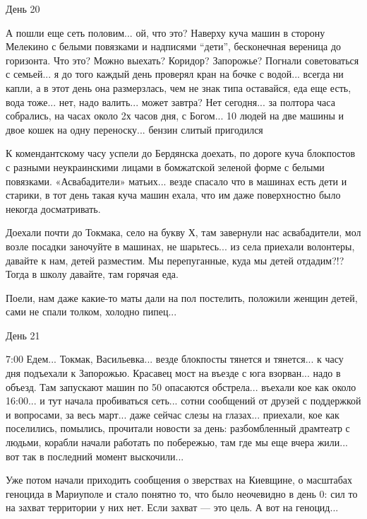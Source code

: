 День 20

А пошли еще сеть половим... ой, что это? Наверху куча машин в сторону Мелекино с
белыми повязками и надписями \enquote{дети}, бесконечная вереница до горизонта. Что
это? Можно выехать? Коридор? Запорожье? Погнали советоваться с семьей... я до
того каждый день проверял кран на бочке с водой... всегда ни капли, а в этот день
она размерзлась, чем не знак типа оставайся, еда еще есть, вода тоже... нет, надо
валить... может завтра? Нет сегодня... за полтора часа собрались, на часах около 2х
часов дня, с Богом... 10 людей на две машины и двое кошек на одну
переноску... бензин слитый пригодился

К комендантскому часу успели до Бердянска доехать, по дороге куча блокпостов с
разными неукраинскими лицами в бомжатской зеленой форме с белыми повязками.
«Асвабадители» матьих... везде спасало что в машинах есть дети и старики, в тот
день такая куча машин ехала, что им даже поверхностно было некогда
досматривать.

Доехали почти до Токмака, село на букву Х, там завернули нас асвабадители, мол
возле посадки заночуйте в машинах, не шарьтесь... из села приехали волонтеры,
давайте к нам, детей разместим. Мы перепуганные, куда мы детей отдадим?!? Тогда
в школу давайте, там горячая еда.

Поели, нам даже какие-то маты дали на пол постелить, положили женщин детей,
сами не спали толком, холодно пипец...

День 21

7:00 Едем... Токмак, Васильевка... везде блокпосты тянется и тянется... к часу дня
подъехали к Запорожью. Красавец мост на въезде с юга взорван... надо в объезд.
Там запускают машин по 50 опасаются обстрела... въехали кое как около 16:00... и
тут начала пробиваться сеть... сотни сообщений от друзей с поддержкой и
вопросами, за весь март... даже сейчас слезы на глазах... приехали, кое как
поселились, помылись, прочитали новости за день: разбомбленный драмтеатр с
людьми, корабли начали работать по побережью, там где мы еще вчера жили... вот
так в последний момент выскочили...

Уже потом начали приходить сообщения о зверствах на Киевщине, о масштабах
геноцида в Мариуполе и стало понятно то, что было неочевидно в день 0: сил то
на захват территории у них нет. Если захват — это цель. А вот на геноцид...

